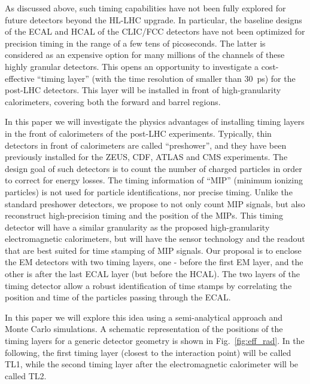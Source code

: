 \documentclass[final,1p,11pt]{elsarticle}
\begin{document}
As discussed above, such timing capabilities have not been fully explored for future detectors beyond the HL-LHC upgrade. 
In particular, the baseline designs of the ECAL and HCAL of the CLIC/FCC detectors have not been 
optimized for precision timing in the range of a few tens of picoseconds. 
The latter is considered as an expensive option for many millions of the channels of these highly granular detectors. 
This opens an opportunity to investigate a cost-effective ``timing layer'' (with the time resolution of smaller than 30~ps) for the post-LHC detectors. 
This layer will be installed in front of high-granularity calorimeters, covering both the forward and barrel regions.

In this paper we  will investigate the physics advantages of installing timing layers in the front of calorimeters  
of the post-LHC experiments. 
Typically, thin detectors in front of calorimeters are called ``preshower'', and they have been previously installed for the ZEUS, CDF, ATLAS and CMS experiments.
The design goal of such detectors is to count the number of charged
particles in order to correct for energy losses. The timing information of ``MIP'' (minimum ionizing particles) is 
not used for particle identifications, nor precise timing. 
Unlike the standard preshower detectors, we propose to not only count MIP signals, but also reconstruct high-precision timing and the position of the MIPs.
This timing detector will have a similar granularity as the proposed high-granularity electromagnetic calorimeters, 
but will have the sensor technology and the readout that are best suited for time stamping of MIP signals.
Our proposal is to enclose the EM detectors with two timing layers, one - before the first EM layer, and the other is after the last ECAL layer (but before
the HCAL). The two layers of the timing detector allow a robust identification of time stamps by correlating the position and time of the particles passing through
the ECAL.

In this paper we will explore this idea using a semi-analytical approach and Monte Carlo simulations. 
A schematic representation of the positions of the timing layers for a generic detector geometry is shown in Fig.~\ref{fig:eff_rad}. 
In the following, the first timing layer (closest to the interaction point) will be called TL1, while the second timing layer after the electromagnetic calorimeter will be called TL2.
\end{document}
